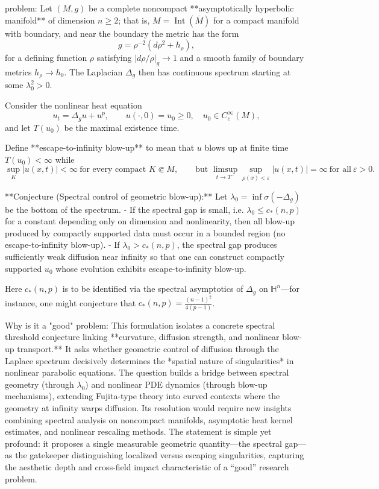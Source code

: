 problem:  
Let \((M,g)\) be a complete noncompact **asymptotically hyperbolic manifold** of dimension \(n\ge2\); that is, \(M = \operatorname{Int}(\overline M)\) for a compact manifold with boundary, and near the boundary the metric has the form  
\[
g=\rho^{-2}(d\rho^2 + h_\rho),
\]
for a defining function \(\rho\) satisfying \(|d\rho/\rho|_g\to 1\) and a smooth family of boundary metrics \(h_\rho\to h_0\).  The Laplacian \(\Delta_g\) then has continuous spectrum starting at some \(\lambda_0^2>0\).  

Consider the nonlinear heat equation
\[
u_t = \Delta_g u + u^p,\qquad u(\cdot,0)=u_0\ge0,\quad u_0\in C_c^\infty(M),
\]
and let \(T(u_0)\) be the maximal existence time.

Define **escape-to-infinity blow-up** to mean that \(u\) blows up at finite time \(T(u_0)<\infty\) while
\[
\sup_K|u(x,t)|<\infty \ \text{for every compact }K\Subset M,
\qquad
\text{but } \limsup_{t\to T^-}\sup_{\rho(x)<\varepsilon}|u(x,t)|=\infty\ \text{for all}\ \varepsilon>0.
\]

**Conjecture (Spectral control of geometric blow-up):**  
Let \(\lambda_0=\inf\sigma(-\Delta_g)\) be the bottom of the spectrum.  
- If the spectral gap is small, i.e. \(\lambda_0\le c_*(n,p)\) for a constant depending only on dimension and nonlinearity, then all blow-up produced by compactly supported data must occur in a bounded region (no escape-to-infinity blow-up).  
- If \(\lambda_0 > c_*(n,p)\), the spectral gap produces sufficiently weak diffusion near infinity so that one can construct compactly supported \(u_0\) whose evolution exhibits escape-to-infinity blow-up.

Here \(c_*(n,p)\) is to be identified via the spectral asymptotics of \(\Delta_g\) on \(\mathbb{H}^n\)—for instance, one might conjecture that \(c_*(n,p)=\frac{(n-1)^2}{4(p-1)}\).

Why is it a "good" problem:  
This formulation isolates a concrete spectral threshold conjecture linking **curvature, diffusion strength, and nonlinear blow-up transport.**  It asks whether geometric control of diffusion through the Laplace spectrum decisively determines the *spatial nature of singularities* in nonlinear parabolic equations.  The question builds a bridge between spectral geometry (through \(\lambda_0\)) and nonlinear PDE dynamics (through blow-up mechanisms), extending Fujita-type theory into curved contexts where the geometry at infinity warps diffusion.  Its resolution would require new insights combining spectral analysis on noncompact manifolds, asymptotic heat kernel estimates, and nonlinear rescaling methods.  The statement is simple yet profound: it proposes a single measurable geometric quantity—the spectral gap—as the gatekeeper distinguishing localized versus escaping singularities, capturing the aesthetic depth and cross-field impact characteristic of a “good” research problem.